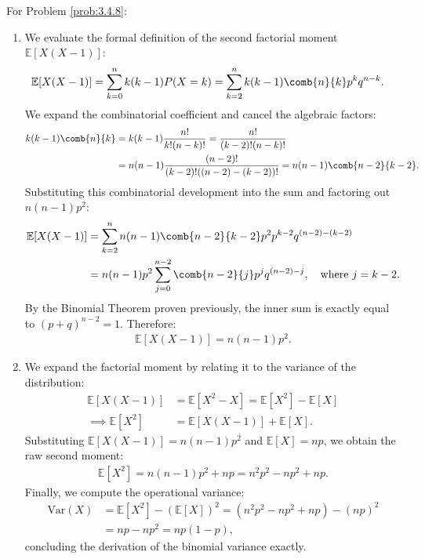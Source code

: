 \begin{solucion}
	\label{sol:3.4.8}
	For Problem \ref{prob:3.4.8}:
	\begin{enumerate}
		\item We evaluate the formal definition of the second factorial moment $\mathbb{E}[X(X-1)]$:
		\begin{align*}
			\mathbb{E}[X(X-1)] &= \sum_{k=0}^n k(k-1) P(X = k) = \sum_{k=2}^n k(k-1) \comb{n}{k} p^k q^{n-k}.
		\end{align*}
		We expand the combinatorial coefficient and cancel the algebraic factors:
		\begin{align*}
			k(k-1) \comb{n}{k} &= k(k-1) \dfrac{n!}{k!(n-k)!} = \dfrac{n!}{(k-2)!(n-k)!} \\
			&= n(n-1) \dfrac{(n-2)!}{(k-2)!((n-2)-(k-2))!} = n(n-1) \comb{n-2}{k-2}.
		\end{align*}
		Substituting this combinatorial development into the sum and factoring out $n(n-1)p^2$:
		\begin{align*}
			\mathbb{E}[X(X-1)] &= \sum_{k=2}^n n(n-1)\comb{n-2}{k-2} p^2 p^{k-2} q^{(n-2)-(k-2)} \\
			&= n(n-1)p^2 \sum_{j=0}^{n-2} \comb{n-2}{j} p^j q^{(n-2)-j}, \quad \text{where } j = k-2.
		\end{align*}
		By the Binomial Theorem proven previously, the inner sum is exactly equal to $(p+q)^{n-2} = 1$. Therefore:
		\begin{align*}
			\mathbb{E}[X(X-1)] = n(n-1)p^2.
		\end{align*}
		\item We expand the factorial moment by relating it to the variance of the distribution:
		\begin{align*}
			\mathbb{E}[X(X-1)] &= \mathbb{E}[X^2 - X] = \mathbb{E}[X^2] - \mathbb{E}[X] \\
			\implies \mathbb{E}[X^2] &= \mathbb{E}[X(X-1)] + \mathbb{E}[X].
		\end{align*}
		Substituting $\mathbb{E}[X(X-1)] = n(n-1)p^2$ and $\mathbb{E}[X] = np$, we obtain the raw second moment:
		\begin{align*}
			\mathbb{E}[X^2] = n(n-1)p^2 + np = n^2 p^2 - np^2 + np.
		\end{align*}
		Finally, we compute the operational variance:
		\begin{align*}
			\text{Var}(X) &= \mathbb{E}[X^2] - (\mathbb{E}[X])^2 = (n^2 p^2 - np^2 + np) - (np)^2 \\
			&= np - np^2 = np(1-p),
		\end{align*}
		concluding the derivation of the binomial variance exactly.
	\end{enumerate}
\end{solucion}

